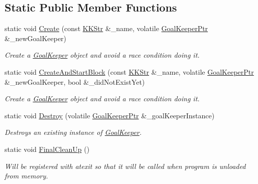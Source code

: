 \subsection*{Static Public Member Functions}
\begin{DoxyCompactItemize}
\item 
static void \hyperlink{class_k_k_b_1_1_goal_keeper_a46f564dd14177c3e6c413a2853e8de2b}{Create} (const \hyperlink{class_k_k_b_1_1_k_k_str}{K\+K\+Str} \&\+\_\+name, volatile \hyperlink{class_k_k_b_1_1_goal_keeper_a03e9ff735713903c739d1cf9734b5dda}{Goal\+Keeper\+Ptr} \&\+\_\+new\+Goal\+Keeper)
\begin{DoxyCompactList}\small\item\em Create a \hyperlink{class_k_k_b_1_1_goal_keeper}{Goal\+Keeper} object and avoid a race condition doing it. \end{DoxyCompactList}\item 
static void \hyperlink{class_k_k_b_1_1_goal_keeper_abbad335db421567cde3601e364fe1a76}{Create\+And\+Start\+Block} (const \hyperlink{class_k_k_b_1_1_k_k_str}{K\+K\+Str} \&\+\_\+name, volatile \hyperlink{class_k_k_b_1_1_goal_keeper_a03e9ff735713903c739d1cf9734b5dda}{Goal\+Keeper\+Ptr} \&\+\_\+new\+Goal\+Keeper, bool \&\+\_\+did\+Not\+Exist\+Yet)
\begin{DoxyCompactList}\small\item\em Create a \hyperlink{class_k_k_b_1_1_goal_keeper}{Goal\+Keeper} object and avoid a race condition doing it. \end{DoxyCompactList}\item 
static void \hyperlink{class_k_k_b_1_1_goal_keeper_a160956bdf558db46a1e0f34b658d0d14}{Destroy} (volatile \hyperlink{class_k_k_b_1_1_goal_keeper_a03e9ff735713903c739d1cf9734b5dda}{Goal\+Keeper\+Ptr} \&\+\_\+goal\+Keeper\+Instance)
\begin{DoxyCompactList}\small\item\em Destroys an existing instance of \hyperlink{class_k_k_b_1_1_goal_keeper}{Goal\+Keeper}. \end{DoxyCompactList}\item 
static void \hyperlink{class_k_k_b_1_1_goal_keeper_aefe6575fd93ee87f4dba12607d1a1fcf}{Final\+Clean\+Up} ()
\begin{DoxyCompactList}\small\item\em Will be registered with \textquotesingle{}atexit\textquotesingle{} so that it will be called when program is unloaded from memory. \end{DoxyCompactList}\end{DoxyCompactItemize}
